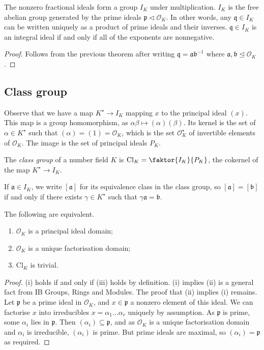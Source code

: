 \begin{corollary}
    The nonzero fractional ideals form a group \( I_K \) under multiplication.
    \( I_K \) is the free abelian group generated by the prime ideals \( \mathfrak p \triangleleft \mathcal O_K \).
    In other words, any \( \mathfrak q \in I_K \) can be written uniquely as a product of prime ideals and their inverses.
    \( \mathfrak q \in I_K \) is an integral ideal if and only if all of the exponents are nonnegative.
\end{corollary}
\begin{proof}
    Follows from the previous theorem after writing \( \mathfrak q = \mathfrak a \mathfrak b^{-1} \) where \( \mathfrak a, \mathfrak b \trianglelefteq \mathcal O_K \).
\end{proof}

\subsection{Class group}
Observe that we have a map \( K^\star \to I_K \) mapping \( x \) to the principal ideal \( (x) \).
This map is a group homomorphism, as \( \alpha\beta \mapsto (\alpha)(\beta) \).
Its kernel is the set of \( \alpha \in K^\star \) such that \( (\alpha) = (1) = \mathcal O_K \), which is the set \( \mathcal O_K^\star \) of invertible elements of \( \mathcal O_K \).
The image is the set of principal ideals \( P_K \).
\begin{definition}
    The \emph{class group} of a number field \( K \) is \( \mathrm{Cl}_K = \faktor{I_K}{P_K} \), the cokernel of the map \( K^\star \to I_K \).
\end{definition}
If \( \mathfrak a \in I_K \), we write \( [\mathfrak a] \) for its equivalence class in the class group, so \( [\mathfrak a] = [\mathfrak b] \) if and only if there exists \( \gamma \in K^\star \) such that \( \gamma \mathfrak a = \mathfrak b \).
\begin{theorem}
    The following are equivalent.
    \begin{enumerate}
        \item \( \mathcal O_K \) is a principal ideal domain;
        \item \( \mathcal O_K \) is a unique factorisation domain;
        \item \( \mathrm{Cl}_K \) is trivial.
    \end{enumerate}
\end{theorem}
\begin{proof}
    (i) holds if and only if (iii) holds by definition.
    (i) implies (ii) is a general fact from IB Groups, Rings and Modules.
    The proof that (ii) implies (i) remains.
    Let \( \mathfrak p \) be a prime ideal in \( \mathcal O_K \), and \( x \in \mathfrak p \) a nonzero element of this ideal.
    We can factorise \( x \) into irreducibles \( x = \alpha_1 \dots \alpha_r \) uniquely by assumption.
    As \( \mathfrak p \) is prime, some \( \alpha_i \) lies in \( \mathfrak p \).
    Then \( (\alpha_i) \subseteq \mathfrak p \), and as \( \mathcal O_K \) is a unique factorisation domain and \( \alpha_i \) is irreducible, \( (\alpha_i) \) is prime.
    But prime ideals are maximal, so \( (\alpha_i) = \mathfrak p \) as required.
\end{proof}
